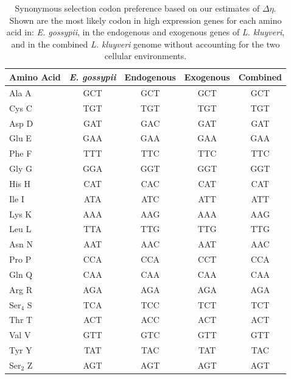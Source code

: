\documentclass[doublespacing,linenumbers]{bmcart-modified}
\newcommand{\kluyveri}{\textit{L. kluyveri}\xspace}
\newcommand{\gossypii}{\textit{E. gossypii}\xspace}
\newcommand{\DE}{\ensuremath{{\Delta \eta}}\xspace}
\begin{document}
\begin{backmatter}
\begin{table}
    \centering
    \caption{Synonymous selection codon preference based on our estimates of $\DE$.
	 Shown are the most likely codon in high expression genes for each amino acid in: \gossypii, in the endogenous and exogenous genes of \kluyveri, and in the combined \kluyveri genome without accounting for the two cellular environments.}
\begin{tabular}{  l  c  c  c  c  }
\hline
	Amino Acid & \gossypii & Endogenous & Exogenous & Combined \\ \hline
	Ala A & GCT & GCT & GCT & GCT \\ 
	Cys C & TGT & TGT & TGT & TGT \\ 
	Asp D & GAT & GAC & GAT & GAT \\ 
	Glu E & GAA & GAA & GAA & GAA \\ 
	Phe F & TTT & TTC & TTC & TTC \\ 
	Gly G & GGA & GGT & GGT & GGT \\ 
	His H & CAT & CAC & CAT & CAT \\ 
	Ile I & ATA & ATC & ATT & ATT \\ 
	Lys K & AAA & AAG & AAA & AAG \\ 
	Leu L & TTA & TTG & TTG & TTG \\ 
	Asn N & AAT & AAC & AAT & AAC \\ 
	Pro P & CCA & CCA & CCT & CCA \\ 
	Gln Q & CAA & CAA & CAA & CAA \\ 
	Arg R & AGA & AGA & AGA & AGA \\ 
	Ser$_4$ S & TCA & TCC & TCT & TCT \\ 
	Thr T & ACT & ACC & ACT & ACT \\ 
	Val V & GTT & GTC & GTT & GTT \\ 
	Tyr Y & TAT & TAC & TAT & TAC \\ 
	Ser$_2$ Z & AGT & AGT & AGT & AGT \\ \hline
\end{tabular}
    \label{tab:codon_pref_deta}
\end{table}


\end{backmatter}
\end{document}
